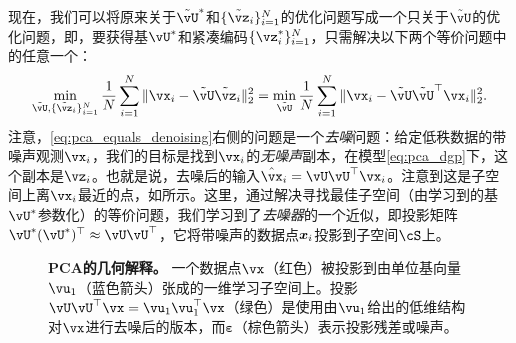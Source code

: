 \documentclass[../../book-main.tex]{subfiles}
\begin{document}
现在，我们可以将原来关于\(\tilde{\vU}^{\ast}\)和\(\{\tilde{\vz}_{i}\}_{i = 1}^{N}\)的优化问题写成一个只关于\(\tilde{\vU}\)的优化问题，即，要获得基\(\vU^{\ast}\)和紧凑编码\(\{\vz_{i}^{\ast}\}_{i = 1}^{N}\)，只需解决以下两个等价问题中的任意一个：
\begin{equation}\label{eq:pca_equals_denoising}
    \min_{\tilde{\vU}, \{\tilde{\vz}_{i}\}_{i = 1}^{N}}\frac{1}{N}\sum_{i = 1}^{N}\norm{\vx_{i} - \tilde{\vU}\tilde{\vz}_{i}}_{2}^{2} = \min_{\tilde{\vU}}\frac{1}{N}\sum_{i = 1}^{N}\norm{\vx_{i} - \tilde{\vU}\tilde{\vU}^{\top}\vx_{i}}_{2}^{2}.
\end{equation}
注意，\eqref{eq:pca_equals_denoising}右侧的问题是一个\textit{去噪}问题：给定低秩数据的带噪声观测\(\vx_{i}\)，我们的目标是找到\(\vx_{i}\)的\textit{无噪声}副本，在模型\eqref{eq:pca_dgp}下，这个副本是$\vz_{i}$。也就是说，去噪后的输入$\hat{\vx}_i = \vU\vU^\top \vx_i$。注意到这是子空间上离$\vx_i$最近的点，如所示。这里，通过解决寻找最佳子空间（由学习到的基\(\vU^{\ast}\)参数化）的等价问题，我们学习到了\textit{去噪器}的一个近似，即投影矩阵\(\vU^{\ast}(\vU^{\ast})^{\top} \approx \vU\vU^{\top}\)，它将带噪声的数据点$\bm{x}_i$投影到子空间\(\cS\)上。%

\begin{figure}
    \centering
    \caption{\small \textbf{PCA的几何解释。} 一个数据点$\vx$（红色）被投影到由单位基向量$\vu_1$（蓝色箭头）张成的一维学习子空间上。投影$\vU\vU^\top\vx = \vu_{1}\vu_{1}^{\top}\vx$（绿色）是使用由$\vu_{1}$给出的低维结构对$\vx$进行去噪后的版本，而$\boldsymbol{\varepsilon}$（棕色箭头）表示投影残差或噪声。}
    \label{fig:pca-geometry}
\end{figure}
\end{document}
